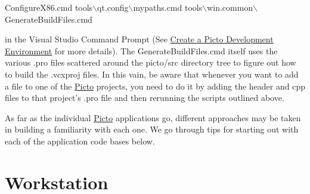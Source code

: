 \begin{DoxyCode}
ConfigureX86.cmd
tools\(\backslash\)qt.config\(\backslash\)mypaths.cmd
tools\(\backslash\)win.common\(\backslash\)GenerateBuildFiles.cmd
\end{DoxyCode}
 in the Visual Studio Command Prompt (See \hyperlink{build_environment_preparation}{Create a Picto Development Environment} for more details). The Generate\-Build\-Files.\-cmd itself uses the various .pro files scattered around the picto/src directory tree to figure out how to build the .vcxproj files. In this vain, be aware that whenever you want to add a file to one of the \hyperlink{namespace_picto}{Picto} projects, you need to do it by adding the header and cpp files to that project's .pro file and then rerunning the scripts outlined above.

As far as the individual \hyperlink{namespace_picto}{Picto} applications go, different approaches may be taken in building a familiarity with each one. We go through tips for starting out with each of the application code bases below.\hypertarget{first_code_look_first_look_Workstation}{}\section{Workstation}\label{first_code_look_first_look_Workstation}
